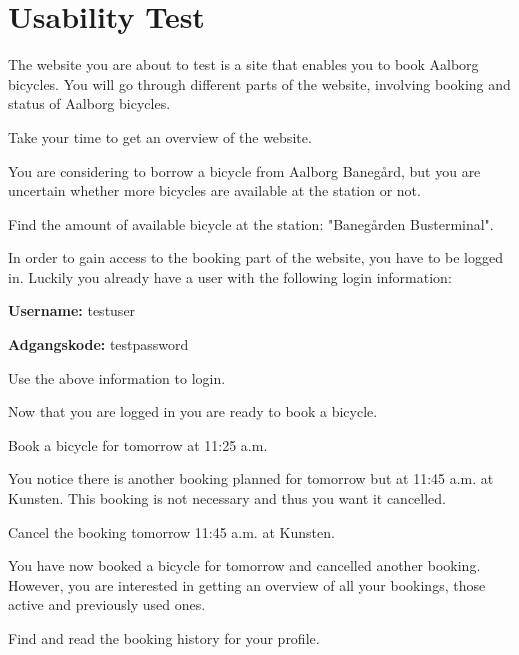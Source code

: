 \chapter{Usability Test}\label{app:usability-test}
	The website you are about to test is a site that enables you to book Aalborg bicycles.
	You will go through different parts of the website, involving booking and status of Aalborg bicycles.
	
	\begin{description}[style=nextline]
		\item[Establish an overview]
			Take your time to get an overview of the website.
		\item[Status for bicycle]
			You are considering to borrow a bicycle from Aalborg Banegård, but you are uncertain whether more bicycles are available at the station or not.
		
			Find the amount of available bicycle at the station: "Banegården Busterminal".
		\item[Booking - Login Part]
			In order to gain access to the booking part of the website, you have to be logged in.
			Luckily you already have a user with the following login information:
			
			\textbf{Username:} testuser
			
			\textbf{Adgangskode:} testpassword
			
			Use the above information to login.
		\item[Booking - Time and booking part]
			 Now that you are logged in you are ready to book a bicycle.
			 
			 Book a bicycle for tomorrow at 11:25 a.m.
		\item[Cancel planned booking]
			 You notice there is another booking planned for tomorrow but at 11:45 a.m. at Kunsten.
			 This booking is not necessary and thus you want it cancelled.
			 
			 Cancel the booking tomorrow 11:45 a.m. at Kunsten.
		\item[Examine the booking history]
			You have now booked a bicycle for tomorrow and cancelled another booking.
			However, you are interested in getting an overview of all your bookings, those active and previously used ones.
			
			Find and read the booking history for your profile.
	\end{description}